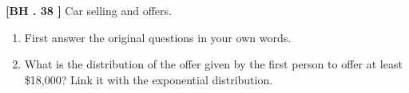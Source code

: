 \begin{exercise}
	\textbf{[BH . 38 ]} Car selling and offers.
	\begin{enumerate}
		\item First answer the original questions in your own words. 
		\item What is the distribution of the offer given by the  first person to offer at least \$18,000? Link it with the exponential distribution. 
	\end{enumerate} 
\end{exercise}

